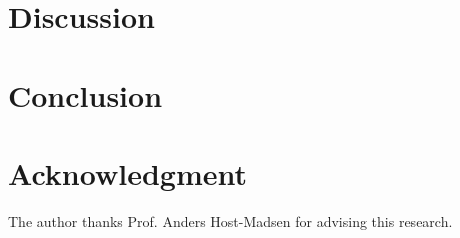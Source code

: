 \documentclass[conference]{IEEEtran}
\begin{document}
\section{Discussion}


\section{Conclusion}


\section*{Acknowledgment}

The author thanks Prof. Anders Host-Madsen for advising this research.

\end{document}
